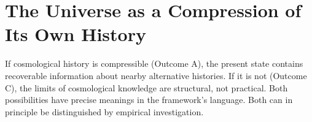 \section{The Universe as a Compression of Its Own History}

If cosmological history is compressible (Outcome A), the present state contains recoverable information about nearby alternative histories. If it is not (Outcome C), the limits of cosmological knowledge are structural, not practical. Both possibilities have precise meanings in the framework's language. Both can in principle be distinguished by empirical investigation.

